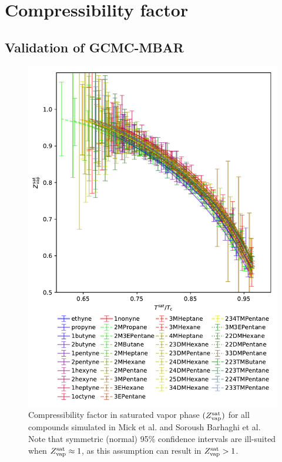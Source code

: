 \documentclass[journal=jctc,manuscript=article]{achemso}
\begin{document}
\newpage
\clearpage


\section{Compressibility factor} \label{SI sec: Z}

\subsection{Validation of GCMC-MBAR}

\begin{figure}[htb!]
	\centering
	\includegraphics[width=4.8in]{Compressibility_factor_all.pdf}
	\caption{Compressibility factor in saturated vapor phase $(Z^{\rm sat}_{\rm vap})$ for all compounds simulated in Mick et al. and Soroush Barhaghi et al. Note that symmetric (normal) 95\% confidence intervals are ill-suited when $Z^{\rm sat}_{\rm vap} \approx 1$, as this assumption can result in $Z^{\rm sat}_{\rm vap} > 1$.}
	\label{SI fig:Z}
\end{figure}
\end{document}
